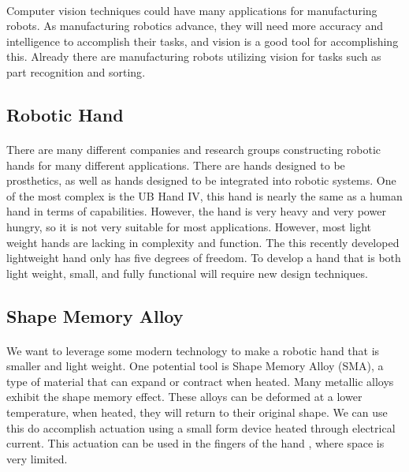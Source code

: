 \documentclass[titlepage,letterpaper,12pt]{article}
\begin{document}
\paragraph{}Computer vision techniques could have many applications for
manufacturing robots. As manufacturing robotics advance, they will need more
accuracy and intelligence to accomplish their tasks, and vision is a good tool
for accomplishing this. Already there are manufacturing robots utilizing vision
for tasks such as part recognition and sorting\cite{SIRfuture}.

\subsection{Robotic Hand}
\paragraph{}There are many different companies and research groups constructing
robotic hands for many different applications. There are hands designed to be
prosthetics, as well as hands designed to be integrated into robotic systems.
One of the most complex is the UB Hand IV, this hand is nearly the same as a
human hand in terms of capabilities. However, the hand is very heavy and very
power hungry, so it is not very suitable for most
applications\cite{Melchiorri2013}. However, most light weight hands are lacking
in complexity and function. The this recently developed lightweight hand only
has five degrees of freedom\cite{takaki2011high}. To develop a hand that is both
light weight, small, and fully functional will require new design techniques.

\subsection{Shape Memory Alloy}
\paragraph{}We want to leverage some modern technology to make a robotic hand
that is smaller and light weight. One potential tool is Shape Memory Alloy
(SMA), a type of material that can expand or contract when
heated\cite{Schetky1982}. Many metallic alloys exhibit the shape memory
effect\cite{Wayman1993}. These alloys can be deformed at a lower temperature,
when heated, they will return to their original shape. We can use this do
accomplish actuation using a small form device heated through electrical
current\cite{Ikuta1990}. This actuation can be used in the fingers of the hand
, where space is very limited.
\end{document}
